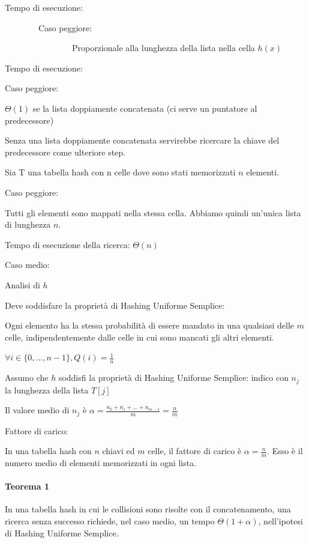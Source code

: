 \documentclass[tikz]{article}
\let\oldparagraph\paragraph
\renewcommand{\paragraph}[1]{\oldparagraph{#1}\mbox{}}
\begin{document}


{Tempo di esecuzione:}

{~~~~~~~~Caso peggiore:}

{~~~~~~~~~~~~~~~~Proporzionale alla lunghezza della lista nella cella $h(x)$}



{Tempo di esecuzione:}

{Caso peggiore:}

{$\Theta(1)$ se la lista doppiamente concatenata (ci serve un puntatore al predecessore)}

{Senza una lista doppiamente concatenata servirebbe ricercare la chiave del predecessore come ulteriore step.}

{Sia T una tabella hash con n celle dove sono stati memorizzati $n$ elementi. }

{Caso peggiore:}

{Tutti gli elementi sono mappati nella stessa cella. Abbiamo quindi
un'unica lista di lunghezza $n$.}

{Tempo di esecuzione della ricerca: $\Theta(n)$}

{Caso medio:}

{Analisi di $h$}

{Deve soddisfare la proprietà di }{Hashing Uniforme Semplice:}

{Ogni elemento ha la stessa probabilità di essere mandato in una qualsiasi delle $m$ celle, indipendentemente dalle celle in cui sono mancati gli altri elementi.}

$\forall i \in \{0,\ldots,n-1\}, Q(i) = \frac{1}{n}$

{Assumo che $h$ soddisfi la proprietà di Hashing Uniforme Semplice: indico con $n_j$ la lunghezza della lista $T[j]$}

{Il valore medio di $n_j$ è $\alpha=\frac{n_0+n_1+\ldots+n_{m-1}}{m}=\frac{n}{m}$}

{Fattore di carico: }

{In una tabella hash con $n$ chiavi ed $m$ celle, il fattore di carico è $\alpha = \frac{n}{m}$. Esso è il numero medio di elementi memorizzati in ogni lista.}

\paragraph{Teorema 1}

{In una tabella hash in cui le collisioni sono risolte con il concatenamento, una ricerca senza successo richiede, nel caso medio, un tempo $\Theta(1+\alpha)$, nell'ipotesi di Hashing Uniforme Semplice.}
\end{document}
